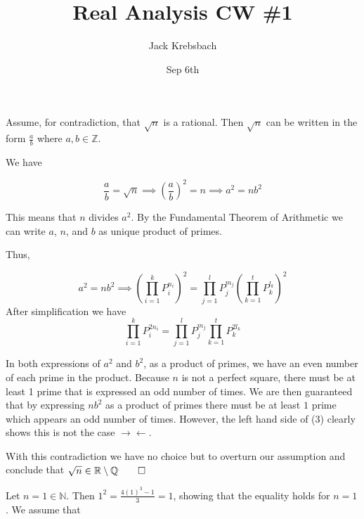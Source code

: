 \documentclass{report}
\title{Real Analysis CW \#1}
\author{Jack Krebsbach }
\date{Sep 6th}
\begin{document}
\maketitle

\sol Assume, for contradiction, that $\sqrt{n}$ is a rational. Then $\sqrt{n}$ can be written in the form $\frac{a}{b}$ where $a,b \in \mathbb{Z}$.

We have 


\begin{equation}
  \frac{a}{b} = \sqrt{n} \implies
  \left(\frac{a}{b}\right)^{2} = n \implies a^2 = n b^2
\end{equation}


This means that $n$ divides $a^{2}$. 
By the Fundamental Theorem of Arithmetic we can write $a$, $n$, and $b$ as  unique product of primes. 

Thus, 

\begin{equation}
 a^2 = n b^2 \implies
 \left(\prod^{k}_{i = 1} P_{i}^{n_i}\right)^2  = \prod_{j = 1}^{l} P_{j}^{m_j}\left(\prod^{t}_{k = 1} P_{k}^{l_k}\right)^2 
\end{equation}
After simplification we have
\begin{equation}
     \prod^{k}_{i = 1} P_{i}^{2n_i}  = \prod_{j = 1}^{l} P_{j}^{m_j}\prod^{t}_{k = 1} P_{k}^{2l_k}
\end{equation}


In both expressions of $a^2$ and $b^2$, as a product of primes, we have an even number of each prime in the product. Because $n$ is not a perfect square, there must be at least 1 prime that is expressed an odd number of times. We are then guaranteed that by expressing $nb^2$ as a product of primes there must be at least $1$ prime which appears an odd number of times. However, the left hand side of (3) clearly shows this is not the case $\rightarrow\!\leftarrow.$

With this contradiction we have no choice but to overturn our assumption and conclude that $\sqrt{n} \in \mathbb{R} \setminus \mathbb{Q} \qed$

\bigskip
{}
\sol

Let $n=1 \in \mathbb{N}$. Then $1^2 =  \frac{4 (1)^{3}-1}{3} = 1$, showing that the equality holds for $n=1$. We assume that 
\end{document}
